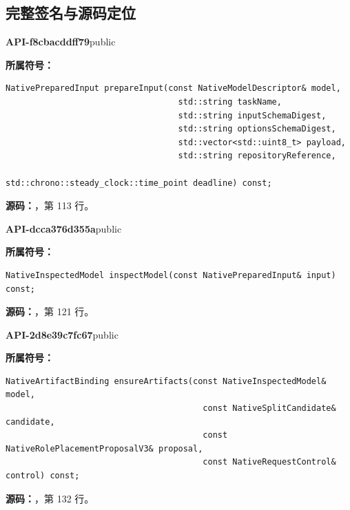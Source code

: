 \subsection{完整签名与源码定位}

\textbf{API-f8cbacddff79}\quad public\par
\textbf{所属符号：}\par
\begin{Verbatim}[fontsize=\footnotesize,breaklines,breakanywhere]
NativePreparedInput prepareInput(const NativeModelDescriptor& model,
                                   std::string taskName,
                                   std::string inputSchemaDigest,
                                   std::string optionsSchemaDigest,
                                   std::vector<std::uint8_t> payload,
                                   std::string repositoryReference,
                                   std::chrono::steady_clock::time_point deadline) const;
\end{Verbatim}
\textbf{源码：}，第 113 行。\par

\textbf{API-dcca376d355a}\quad public\par
\textbf{所属符号：}\par
\begin{Verbatim}[fontsize=\footnotesize,breaklines,breakanywhere]
NativeInspectedModel inspectModel(const NativePreparedInput& input) const;
\end{Verbatim}
\textbf{源码：}，第 121 行。\par

\textbf{API-2d8e39c7fc67}\quad public\par
\textbf{所属符号：}\par
\begin{Verbatim}[fontsize=\footnotesize,breaklines,breakanywhere]
NativeArtifactBinding ensureArtifacts(const NativeInspectedModel& model,
                                        const NativeSplitCandidate& candidate,
                                        const NativeRolePlacementProposalV3& proposal,
                                        const NativeRequestControl& control) const;
\end{Verbatim}
\textbf{源码：}，第 132 行。\par

